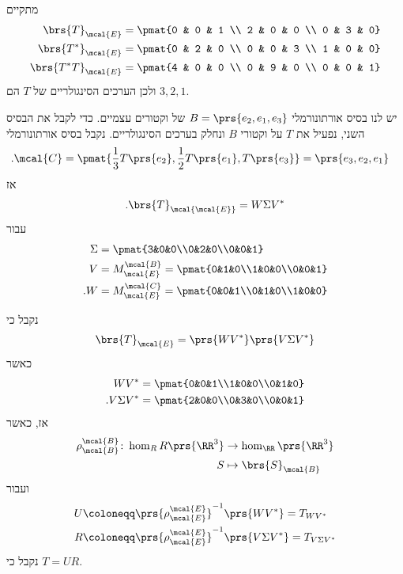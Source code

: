 \documentclass[a4paper,10pt,twoside,openany]{book}
\begin{document}
\begin{solution}
מתקיים
\begin{align*}
\brs{T}_\mcal{E} &= \pmat{0 & 0 & 1 \\ 2 & 0 & 0 \\ 0 & 3 & 0} \\
\brs{T^*}_\mcal{E} &= \pmat{0 & 2 & 0 \\ 0 & 0 & 3 \\ 1 & 0 & 0} \\
\brs{T^* T}_\mcal{E} &= \pmat{4 & 0 & 0 \\ 0 & 9 & 0 \\ 0 & 0 & 1}
\end{align*}
ולכן הערכים הסינגולריים של
$T$
הם
$3,2,1$.

יש לנו בסיס אורתונורמלי
$B = \prs{e_2, e_1, e_3}$
של וקטורים עצמיים.
כדי לקבל את הבסיס השני, נפעיל את
$T$
על וקטורי
$B$
ונחלק בערכים הסינגולריים.
נקבל בסיס אורתונורמלי
\begin{align*}
\text{.} \mcal{C} &= \pmat{\frac{1}{3} T\prs{e_2}, \frac{1}{2} T\prs{e_1}, T\prs{e_3}}
= \prs{e_3, e_2, e_1}
\end{align*}
אז
\begin{align*}
\text{.} \brs{T}_\mcal{\mcal{E}} = W \Sigma V^*
\end{align*}
עבור
\begin{align*}
\Sigma &= \pmat{3&0&0\\0&2&0\\0&0&1} \\
V &= M^\mcal{B}_\mcal{E} = \pmat{0&1&0\\1&0&0\\0&0&1}\\
\text{.} W &= M^\mcal{C}_\mcal{E} = \pmat{0&0&1\\0&1&0\\1&0&0}
\end{align*}

נקבל כי
\begin{align*}
\brs{T}_\mcal{E} = \prs{WV^*} \prs{V \Sigma V^*}
\end{align*}
כאשר
\begin{align*}
W V^* &= \pmat{0&0&1\\1&0&0\\0&1&0} \\
\text{.} V \Sigma V^* &= \pmat{2&0&0\\0&3&0\\0&0&1}
\end{align*}
אז, כאשר
\begin{align*}
\rho^\mcal{B}_\mcal{B} \colon \hom_RR\prs{\RR^3} &\to \hom_\RR\prs{\RR^3} \\
S &\mapsto \brs{S}_\mcal{B}
\end{align*}
ועבור
\begin{align*}
U &\coloneqq \prs{\rho^\mcal{E}_\mcal{E}}^{-1}\prs{W V^*} = T_{W V^*} \\
R &\coloneqq \prs{\rho^\mcal{E}_\mcal{E}}^{-1}\prs{V \Sigma V^*} = T_{V \Sigma V^*}
\end{align*}
נקבל כי
$T = UR$.
\end{solution}
\end{document}
